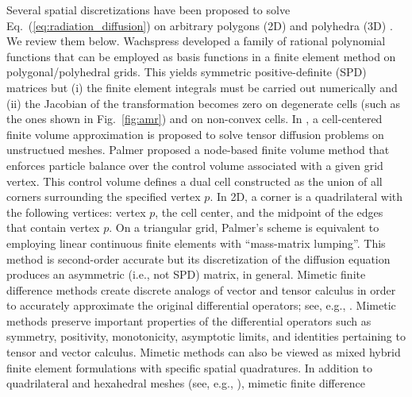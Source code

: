 \documentclass[preprint,10pt]{elsarticle}
\newcommand{\eqt}[1]{Eq.~(\ref{#1})}                     %
\newcommand{\fig}[1]{Fig.~\ref{#1}}                      %
\begin{document}
Several spatial discretizations have been proposed to solve \eqt{eq:radiation_diffusion} on
arbitrary polygons (2D) and polyhedra (3D) \cite{Wachspress,Palmer2001,Kuznetsov2004,Brezzi2005,
LipnikovShashkovSvyatskiy2006,BaileyPhD,BaileyAdams2008,LipnikovShashkov2010}. We review them below.
%
Wachspress \cite{Wachspress} developed a family of rational polynomial functions that can be employed
as basis functions in a finite element method on polygonal/polyhedral grids. This yields
symmetric positive-definite (SPD) matrices but (i) the finite element integrals must be carried out 
numerically and (ii) the Jacobian of the transformation becomes zero on degenerate cells 
(such as the ones shown in \fig{fig:amr}) and on non-convex cells. 
%
In \cite{Herbin2006}, a cell-centered finite volume approximation is proposed to solve tensor diffusion problems
on unstructued meshes.
%
Palmer \cite{Palmer2001,PalmerLLNL} proposed a node-based finite volume method 
that enforces particle balance over the control volume associated with a given grid vertex.
This control volume defines a dual cell constructed as 
the union of all corners surrounding the specified vertex $p$. In 2D, a corner 
is a quadrilateral with the following vertices: vertex $p$, the cell center, and the midpoint
of the edges that contain vertex $p$. On a triangular grid, Palmer's scheme is equivalent 
to employing linear continuous finite elements with ``mass-matrix lumping''. This method is 
second-order accurate but its discretization of the diffusion equation produces an 
asymmetric (i.e., not SPD) matrix, in general.
%
Mimetic finite difference methods create discrete analogs of vector and tensor
calculus in order to accurately approximate the original differential operators;
see, e.g., \cite{HymanMorelShashkovSteinberg2002}.
Mimetic methods preserve important properties of the differential operators such 
as symmetry, positivity, monotonicity, asymptotic limits, and identities pertaining 
to tensor and vector calculus. Mimetic methods can also be viewed as mixed hybrid 
finite element formulations with specific spatial quadratures.  
In addition to quadrilateral and hexahedral meshes (see, e.g., 
\cite{MorelRobertsShashkov1998,MorelHallShashkov2001}), mimetic finite difference 
\end{document}
